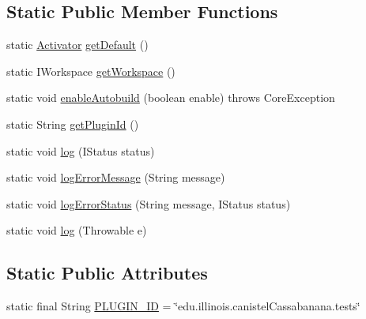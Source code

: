 \subsection*{Static Public Member Functions}
\begin{DoxyCompactItemize}
\item 
static \hyperlink{classedu_1_1illinois_1_1canistelCassabanana_1_1tests_1_1Activator}{Activator} \hyperlink{classedu_1_1illinois_1_1canistelCassabanana_1_1tests_1_1Activator_ae746cfda566e60a2101ca003ab14ca20}{getDefault} ()
\item 
static IWorkspace \hyperlink{classedu_1_1illinois_1_1canistelCassabanana_1_1tests_1_1Activator_ae7ce6c70f7c3b86eb58f701682b1e544}{getWorkspace} ()
\item 
static void \hyperlink{classedu_1_1illinois_1_1canistelCassabanana_1_1tests_1_1Activator_aaf4525a2279ecffb3fa3cbee6e702333}{enableAutobuild} (boolean enable)  throws CoreException 
\item 
static String \hyperlink{classedu_1_1illinois_1_1canistelCassabanana_1_1tests_1_1Activator_a07785d16db9050a06b80bf0b893729fb}{getPluginId} ()
\item 
static void \hyperlink{classedu_1_1illinois_1_1canistelCassabanana_1_1tests_1_1Activator_a7686af7eb64e2c4ea597629842b1be4c}{log} (IStatus status)
\item 
static void \hyperlink{classedu_1_1illinois_1_1canistelCassabanana_1_1tests_1_1Activator_a69d138bfc51efe9f54f58f88095b3a80}{logErrorMessage} (String message)
\item 
static void \hyperlink{classedu_1_1illinois_1_1canistelCassabanana_1_1tests_1_1Activator_a2126884f70fb3a5ef2fa40afb3a9079e}{logErrorStatus} (String message, IStatus status)
\item 
static void \hyperlink{classedu_1_1illinois_1_1canistelCassabanana_1_1tests_1_1Activator_ab20938b38682f1f32fca19d5f6a94933}{log} (Throwable e)
\end{DoxyCompactItemize}
\subsection*{Static Public Attributes}
\begin{DoxyCompactItemize}
\item 
static final String \hyperlink{classedu_1_1illinois_1_1canistelCassabanana_1_1tests_1_1Activator_a1beee14c19ce55e57da19ee01da99070}{PLUGIN\_\-ID} = \char`\"{}edu.illinois.canistelCassabanana.tests\char`\"{}
\end{DoxyCompactItemize}
